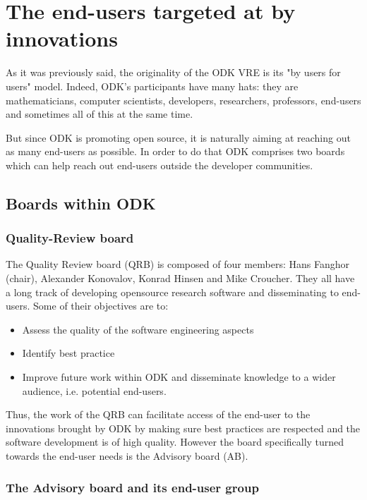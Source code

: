 \documentclass{deliverablereport}
\begin{document}
\section{The end-users targeted at by innovations}


As it was previously said, the originality of the ODK VRE is its "by users for users" model. Indeed, ODK's participants have many hats: they are mathematicians, computer scientists, developers, researchers, professors, end-users and sometimes all of this at the same time.

But since ODK is promoting open source, it is naturally aiming at reaching out as many end-users as possible. In order to do that ODK comprises two boards which can help reach out end-users outside the developer communities.

\subsection{Boards within ODK}

\subsubsection{Quality-Review board}

The Quality Review board (QRB) is composed of four members: Hans
Fanghor (chair), Alexander Konovalov, Konrad Hinsen and Mike
Croucher. They all have a long track of developing opensource research
software and disseminating to end-users. Some of their objectives are
to:

\begin{itemize}
\item{Assess the quality of the software engineering aspects}
\item{Identify best practice}
\item{Improve future work within ODK and disseminate knowledge to a wider audience, i.e. potential end-users.}
\end{itemize}

Thus, the work of the QRB can facilitate access of the end-user to the
innovations brought by ODK by making sure best practices are
respected and the software development is of high quality. However the
board specifically turned towards the end-user needs is the Advisory
board (AB).

\subsubsection{The Advisory board and its end-user group}
\end{document}

